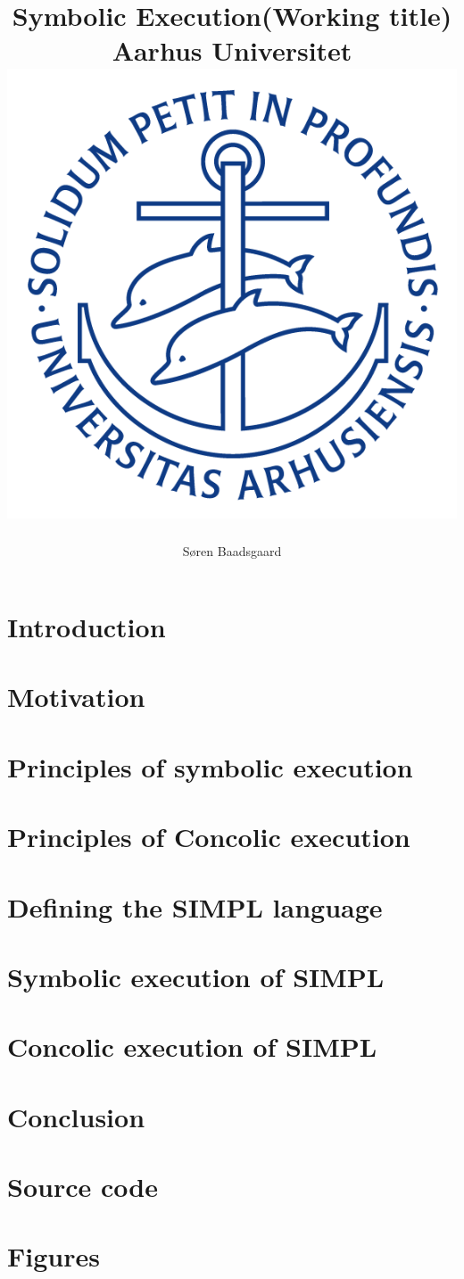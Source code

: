 \documentclass[]{report}
\title{
	\textbf{Symbolic Execution(Working title)}\\
	{\large Aarhus Universitet}\\
	{\includegraphics[scale=0.5]{ausegl_blaa.png}}	
	}
\author{Søren Baadsgaard}
\begin{document}
\maketitle

\begin{abstract}
\end{abstract}

\tableofcontents

\chapter{Introduction}
	
	
\chapter{Motivation}
	
\chapter{Principles of symbolic execution}
	

\chapter{Principles of Concolic execution}

\chapter{Defining the SIMPL language}
\chapter{Symbolic execution of SIMPL}
	
\chapter{Concolic execution of SIMPL}

\chapter{Conclusion}
	

\appendix

\chapter{Source code}

\chapter{Figures}



\end{document}
